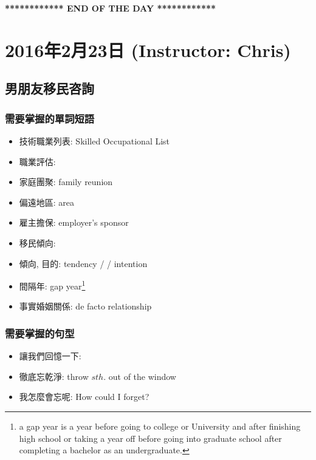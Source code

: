 \vspace{15mm}

\begin{center}
  \textbf{************ END OF THE DAY ************}
\end{center}
\newpage

\section{2016年2月23日 (Instructor: Chris)}
\subsection{男朋友移民咨詢}
\subsubsection*{需要掌握的單詞短語}
\begin{multicols}{2}
\begin{itemize}
  \itemsep0em
  \item 技術職業列表: Skilled Occupational List
  \item 職業評估: 
  \item 家庭團聚: family reunion
  \item 偏遠地區:  area
  \item 雇主擔保: employer's sponsor
  \item 移民傾向: 
  \item 傾向, 目的: tendency /  / intention
  \item 間隔年: gap year\footnote{a gap year is a year before going to college or University and after finishing high school or taking a year off before going into graduate school after completing a bachelor as an undergraduate.}
  \item 事實婚姻關係: de facto relationship
\end{itemize}
\end{multicols}

\subsubsection*{需要掌握的句型}
\begin{multicols}{2}
\begin{itemize}
  \itemsep0em
  \item 讓我們回憶一下: 
  \item 徹底忘乾淨: throw $sth.$ out of the window
  \item 我怎麼會忘呢: How could I forget?
\end{itemize}
\end{multicols}

